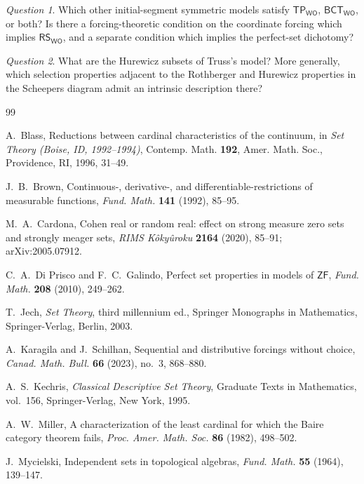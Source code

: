 \documentclass[11pt,reqno]{amsart}
\newcommand{\WO}{\mathsf{WO}}
\newcommand{\BCTWO}{\mathsf{BCT}_{\WO}}
\newcommand{\RSWO}{\mathsf{RS}_{\WO}}
\newcommand{\TP}{\mathsf{TP}_{\WO}}
\theoremstyle{plain}
\theoremstyle{definition}
\theoremstyle{remark}
\newtheorem{question}[question]{Question}
\begin{document}
\begin{question}
Which other initial-segment symmetric models satisfy $\TP$, $\BCTWO$, or both?
Is there a forcing-theoretic condition on the coordinate forcing which implies $\RSWO$, and a separate condition which implies the perfect-set dichotomy?
\end{question}

\begin{question}
What are the Hurewicz subsets of Truss's model?
More generally, which selection properties adjacent to the Rothberger and Hurewicz properties in the Scheepers diagram admit an intrinsic description there?
\end{question}

\begin{thebibliography}{99}

A.~Blass,
Reductions between cardinal characteristics of the continuum,
in \emph{Set Theory (Boise, ID, 1992--1994)},
Contemp. Math. \textbf{192}, Amer. Math. Soc., Providence, RI, 1996,
31--49.

J.~B.~Brown,
Continuous-, derivative-, and differentiable-restrictions of measurable
functions,
\emph{Fund. Math.} \textbf{141} (1992), 85--95.

M.~A.~Cardona,
Cohen real or random real: effect on strong measure zero sets and strongly
meager sets,
\emph{RIMS K\^oky\^uroku} \textbf{2164} (2020), 85--91;
arXiv:2005.07912.

C.~A.~Di Prisco and F.~C.~Galindo,
Perfect set properties in models of $\mathsf{ZF}$,
\emph{Fund. Math.} \textbf{208} (2010), 249--262.

T.~Jech,
\emph{Set Theory}, third millennium ed.,
Springer Monographs in Mathematics, Springer-Verlag, Berlin, 2003.

A.~Karagila and J.~Schilhan,
Sequential and distributive forcings without choice,
\emph{Canad. Math. Bull.} \textbf{66} (2023), no.~3, 868--880.

A.~S.~Kechris,
\emph{Classical Descriptive Set Theory},
Graduate Texts in Mathematics, vol.~156,
Springer-Verlag, New York, 1995.

A.~W.~Miller,
A characterization of the least cardinal for which the Baire category
theorem fails,
\emph{Proc. Amer. Math. Soc.} \textbf{86} (1982), 498--502.

J.~Mycielski,
Independent sets in topological algebras,
\emph{Fund. Math.} \textbf{55} (1964), 139--147.


\end{thebibliography}
\end{document}
